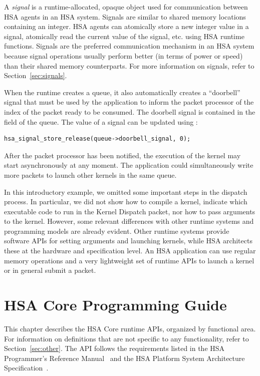 \documentclass[final,oneside]{book}
\begin{document}
A \emph{signal} is a runtime-allocated, opaque object used for communication
between HSA agents in an HSA system. Signals are similar to shared memory
locations containing an integer. HSA agents can atomically store a new integer
value in a signal, atomically read the current value of the signal, etc. using
HSA runtime functions.  Signals are the preferred communication mechanism in an
HSA system because signal operations usually perform better (in terms of power
or speed) than their shared memory counterparts. For more information on
signals, refer to Section~\ref{sec:signals}.

When the runtime creates a queue, it also automatically creates a ``doorbell''
signal that must be used by the application to inform the packet processor of
the index of the packet ready to be consumed. The doorbell signal is contained
in the  field of the queue. The value of a
signal can be updated using :

\begin{lstlisting}
hsa_signal_store_release(queue->doorbell_signal, 0);
\end{lstlisting}

After the packet processor has been notified, the execution of the kernel may
start asynchronously at any moment. The application could simultaneously write
more packets to launch other kernels in the same queue.

In this introductory example, we omitted some important steps in the dispatch
process. In particular, we did not show how to compile a kernel, indicate which
executable code to run in the Kernel Dispatch packet, nor how to pass arguments
to the kernel. However, some relevant differences with other runtime systems and
programming models are already evident.  Other runtime systems provide software
APIs for setting arguments and launching kernels, while HSA architects these at
the hardware and specification level. An HSA application can use regular memory
operations and a very lightweight set of runtime APIs to launch a kernel or in
general submit a packet.


\chapter{HSA Core Programming Guide} \label{coreapi}

This chapter describes the HSA Core runtime APIs, organized by functional
area. For information on definitions that are not specific to any functionality,
refer to Section~\ref{sec:other}. The API follows the requirements listed in the
HSA Programmer's Reference Manual~\cite{prm} and the HSA Platform System
Architecture Specification~\cite{sar}.
\end{document}
